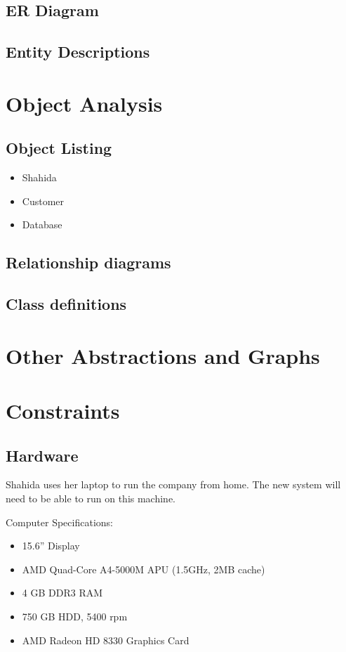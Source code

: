\subsection{ER Diagram}
%

\subsection{Entity Descriptions}
%
\section{Object Analysis}

\subsection{Object Listing}

\begin{itemize}
    \item Shahida
    \item Customer
    \item Database
\end{itemize}

\subsection{Relationship diagrams}
%
\subsection{Class definitions}
%
\section{Other Abstractions and Graphs}

\section{Constraints}

\subsection{Hardware}
Shahida uses her laptop to run the company from home. The new system will need to be able to run on this machine.

Computer Specifications:

\begin{itemize}
    \item 15.6” Display
    \item AMD Quad-Core A4-5000M APU (1.5GHz, 2MB cache)
    \item 4 GB DDR3 RAM
    \item 750 GB HDD, 5400 rpm
    \item AMD Radeon HD 8330 Graphics Card
\end{itemize}

